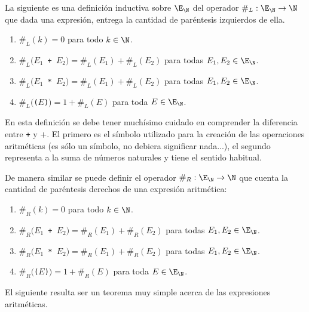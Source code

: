 	\begin{ejemplo}
	La siguiente es una definición inductiva sobre $\E_\N$ del operador $\#_L:\E_\N\rightarrow\N$ que dada una expresión, entrega la cantidad de paréntesis izquierdos de ella.
	\begin{enumerate}
	\itemsep 0pt
		\item $\#_L(k)=0$ para todo $k\in\N$.
		\item $\#_L(E_1$\texttt{ + }$E_2)=\#_L(E_1)+\#_L(E_2)$ \hspace*{1em}para todas $E_1,E_2\in\E_\N$.
		\item $\#_L(E_1$\texttt{ * }$E_2)=\#_L(E_1)+\#_L(E_2)$ \hspace*{1em}para todas $E_1,E_2\in\E_\N$.
		\item $\#_L($\texttt{($E$)}$)=1+\#_L(E)$ \hspace*{1em}para toda $E\in\E_\N$.
	\end{enumerate}
	En esta definición se debe tener muchísimo cuidado en comprender la diferencia entre \texttt{+} y $+$.
	El primero es el símbolo utilizado para la creación de las operaciones aritméticas (es sólo un símbolo, no debiera significar nada...), el segundo representa a la suma de números naturales y tiene el sentido habitual.
	
	De manera similar se puede definir el operador $\#_R:\E_\N\rightarrow\N$ que cuenta la cantidad de paréntesis derechos de una expresión aritmética:
	\begin{enumerate}
	\itemsep 0pt
		\item $\#_R(k)=0$ para todo $k\in\N$.
		\item $\#_R(E_1$\texttt{ + }$E_2)=\#_R(E_1)+\#_R(E_2)$ \hspace*{1em}para todas $E_1,E_2\in\E_\N$.
		\item $\#_R(E_1$\texttt{ * }$E_2)=\#_R(E_1)+\#_R(E_2)$ \hspace*{1em}para todas $E_1,E_2\in\E_\N$.
		\item $\#_R($\texttt{($E$)}$)=1+\#_R(E)$ \hspace*{1em}para toda $E\in\E_\N$.
	\end{enumerate}
	\end{ejemplo}
	
	El siguiente resulta ser un teorema muy simple acerca de las expresiones aritméticas.
	
